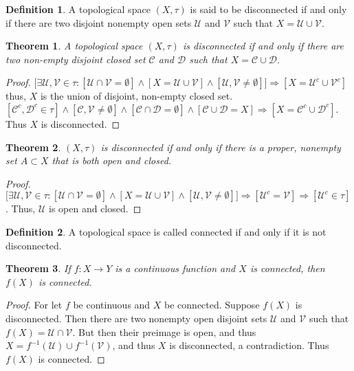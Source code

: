 \documentclass[oneside]{book}
\newtheorem{theorem}{Theorem}[section]
\theoremstyle{definition}
\newtheorem{definition}{Definition}[section]
\begin{document}
\begin{definition}
A topological space $(X,\tau)$ is said to be disconnected if and only if there are two disjoint nonempty open sets $\mathcal{U}$ and $\mathcal{V}$ such that $X = \mathcal{U}\cup \mathcal{V}$.
\end{definition}

\begin{theorem}
A topological space $(X,\tau)$ is disconnected if and only if there are two non-empty disjoint closed set $\mathcal{C}$ and $\mathcal{D}$ such that $X=\mathcal{C}\cup\mathcal{D}$.
\end{theorem}
\begin{proof}
$\big[\exists \mathcal{U},\mathcal{V}\in \tau: [\mathcal{U}\cap \mathcal{V}=\emptyset]\land [X=\mathcal{U}\cup \mathcal{V}]\land [\mathcal{U},\mathcal{V}\ne \emptyset]\big]\Rightarrow [X = \mathcal{U}^c\cup \mathcal{V}^c]$ thus, $X$ is the union of disjoint, non-empty closed set. $[\mathcal{C}^c,\mathcal{D}^c\in \tau]\land[\mathcal{C},\mathcal{V}\ne\emptyset]\land[\mathcal{C}\cap \mathcal{D}=\emptyset]\land[\mathcal{C}\cup\mathcal{D}=X]\Rightarrow [X=\mathcal{C}^c\cup\mathcal{D}^c].$ Thus $X$ is disconnected.
\end{proof}

\begin{theorem}
$(X,\tau)$ is disconnected if and only if there is a proper, nonempty set $A\subset X$ that is both open and closed.
\end{theorem}
\begin{proof}
$\big[\exists \mathcal{U},\mathcal{V}\in \tau:[\mathcal{U}\cap \mathcal{V}=\emptyset]\land [X=\mathcal{U}\cup\mathcal{V}]\land[\mathcal{U},\mathcal{V}\ne \emptyset]\big]\Rightarrow [\mathcal{U}^c = \mathcal{V}]\Rightarrow [\mathcal{U}^c\in \tau]$. Thus, $\mathcal{U}$ is open and closed.
\end{proof}

\begin{definition}
A topological space is called connected if and only if it is not disconnected.
\end{definition}

\begin{theorem}
If $f:X\rightarrow Y$ is a continuous function and $X$ is connected, then $f(X)$ is connected.
\end{theorem}
\begin{proof}
For let $f$ be continuous and $X$ be connected. Suppose $f(X)$ is disconnected. Then there are two nonempty open disjoint sets $\mathcal{U}$ and $\mathcal{V}$ such that $f(X) = \mathcal{U}\cap \mathcal{V}$. But then their preimage is open, and thus $X=f^{-1}(\mathcal{U})\cup f^{-1}(\mathcal{V})$, and thus $X$ is disconnected, a contradiction. Thus $f(X)$ is connected.
\end{proof}
\end{document}
